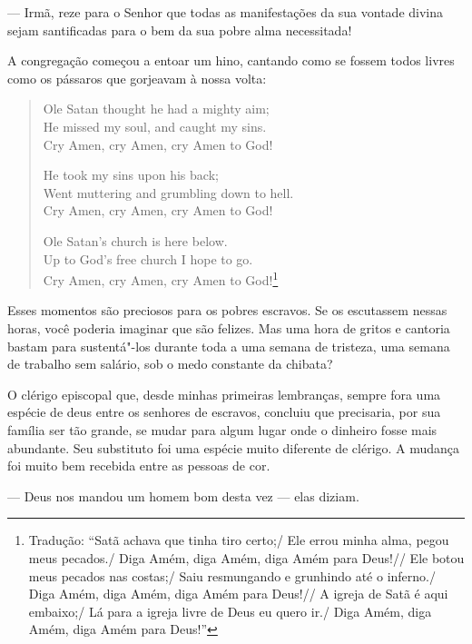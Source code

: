 --- Irmã, reze para o Senhor que todas as manifestações da sua vontade
divina sejam santificadas para o bem da sua pobre alma necessitada!

A congregação começou a entoar um hino,
cantando como se fossem todos livres como os pássaros que gorjeavam à
nossa volta:

\begin{verse}
Ole Satan thought he had a mighty aim;\\
He missed my soul, and caught my sins.\\
Cry Amen, cry Amen, cry Amen to God! 

He took my sins upon his back;\\
Went muttering and grumbling down to hell.\\
Cry Amen, cry Amen, cry Amen to God! 

Ole Satan's church is here below.\\
Up to God's free church I hope to go.\\
Cry Amen, cry Amen, cry Amen to God!\footnote{Tradução: ``Satã achava que tinha tiro
certo;/ Ele errou minha alma, pegou meus pecados./ Diga Amém, diga
Amém, diga Amém para Deus!//
Ele botou meus pecados nas costas;/ Saiu resmungando e grunhindo até o inferno./ Diga Amém, diga Amém, diga Amém para Deus!//
A igreja de Satã é aqui embaixo;/ Lá para a igreja livre de Deus eu
quero ir./ Diga Amém, diga Amém, diga Amém para Deus!''}
\end{verse}

Esses momentos são preciosos para os
pobres escravos. Se os escutassem nessas horas, você poderia imaginar
que são felizes. Mas uma hora de gritos e cantoria bastam para
sustentá"-los durante toda a uma semana de tristeza, uma semana de
trabalho sem salário, sob o medo constante da chibata?

O clérigo episcopal que, desde minhas
primeiras lembranças, sempre fora uma espécie de deus entre os senhores
de escravos, concluiu que precisaria, por sua família ser tão grande, se
mudar para algum lugar onde o dinheiro fosse mais abundante. Seu
substituto foi uma espécie muito diferente de clérigo. A mudança foi
muito bem recebida entre as pessoas de cor.

--- Deus nos mandou um homem bom desta vez --- elas diziam.

